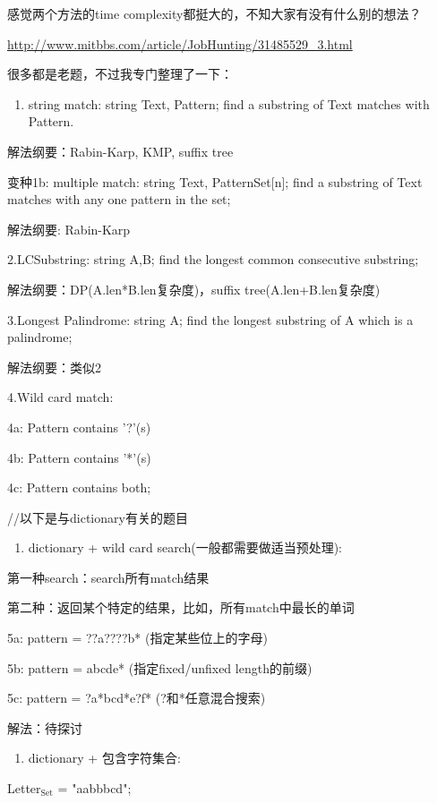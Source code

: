 \documentclass[12pt]{book}
\begin{document}
感觉两个方法的time complexity都挺大的，不知大家有没有什么别的想法？

\url{http://www.mitbbs.com/article/JobHunting/31485529_3.html}

很多都是老题，不过我专门整理了一下：

\begin{enumerate}
\item string match: string Text, Pattern; find a substring of Text matches with Pattern.
\end{enumerate}

解法纲要：Rabin-Karp, KMP, suffix tree

变种1b: multiple match: string Text, PatternSet[n]; find a substring of Text matches with any one pattern in the set;

解法纲要: Rabin-Karp

2.LCSubstring: string A,B; find the longest common consecutive substring;

解法纲要：DP(A.len*B.len复杂度)，suffix tree(A.len+B.len复杂度) 

3.Longest Palindrome: string A; find the longest substring of A which is a palindrome;

解法纲要：类似2

4.Wild card match:

4a: Pattern contains '?'(s)

4b: Pattern contains '*'(s)

4c: Pattern contains both;

//以下是与dictionary有关的题目
\begin{enumerate}
\item dictionary + wild card search(一般都需要做适当预处理):
\end{enumerate}

第一种search：search所有match结果

第二种：返回某个特定的结果，比如，所有match中最长的单词

5a: pattern = ??a????b* (指定某些位上的字母)

5b: pattern = abcde* (指定fixed/unfixed length的前缀)

5c: pattern = ?a*bcd*e?f* (?和*任意混合搜索)

解法：待探讨

\begin{enumerate}
\item dictionary + 包含字符集合:
\end{enumerate}

Letter$_{\text{Set}}$ = "aabbbcd";
\end{document}
